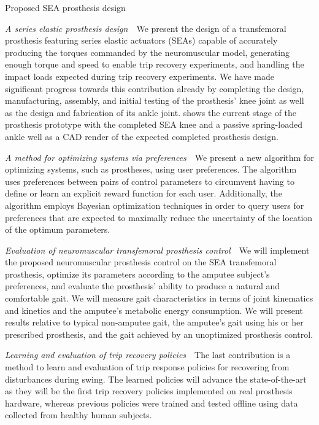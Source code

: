 \begin{marginfigure}
    \centering
    \caption{Proposed SEA prosthesis design}
    \label{fig:prosthesis_design}
\end{marginfigure}

\begin{contributions}
    \item\label{contrib:pros_design} \emph{A series elastic prosthesis
    design}~~We present the design of a transfemoral prosthesis featuring series
    elastic actuators (SEAs) capable of accurately producing the torques
    commanded by the neuromuscular model, generating enough torque and speed to
    enable trip recovery experiments, and handling the impact loads expected
    during trip recovery experiments. We have made significant progress towards
    this contribution already by completing the design, manufacturing, assembly,
    and initial testing of the prosthesis' knee joint as well as the design and
    fabrication of its ankle joint.   shows the
    current stage of the prosthesis prototype with the completed SEA knee and a
    passive spring-loaded ankle well as a CAD render of the expected completed
    prosthesis design.

    \item\label{contrib:pref_opt} \emph{A method for optimizing systems via
    preferences}~~We present a new algorithm for optimizing systems, such as
    prostheses, using user preferences.  The algorithm uses preferences between
    pairs of control parameters to circumvent having to define or learn an
    explicit reward function for each user. Additionally, the algorithm employs
    Bayesian optimization techniques in order to query users for preferences
    that are expected to maximally reduce the uncertainty of the location of the
    optimum parameters.

    \item\label{contrib:neuromuc_eval} \emph{Evaluation of neuromuscular
    transfemoral prosthesis control}~~We will implement the proposed
    neuromuscular prosthesis control on the SEA transfemoral prosthesis,
    optimize its parameters according to the amputee subject's preferences, and
    evaluate the prosthesis' ability to produce a natural and comfortable gait.
    We will measure gait characteristics in terms of joint kinematics and
    kinetics and the amputee's metabolic energy consumption. We will present
    results relative to typical non-amputee gait, the amputee's gait using his
    or her prescribed prosthesis, and the gait achieved by an unoptimized
    prosthesis control.

    \item\label{contrib:trip_recovery} \emph{Learning and evaluation of trip
    recovery policies}~~The last contribution is a method to learn and
    evaluation of trip response policies for recovering from disturbances during
    swing. The learned policies will advance the state-of-the-art as they will
    be the first trip recovery policies implemented on real prosthesis hardware,
    whereas previous policies were trained and tested offline using data
    collected from healthy human subjects.
\end{contributions}
